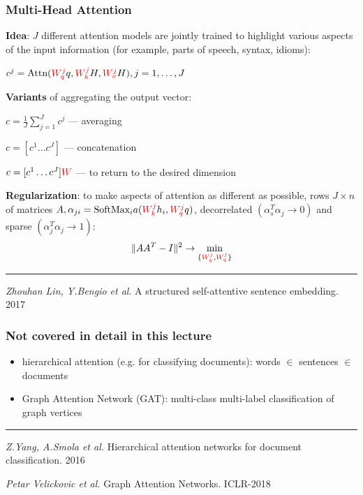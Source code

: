 \documentclass[fullscreen=true, bookmarks=true, hyperref={pdfencoding=unicode}]{beamer}
\begin{document}
\begin{frame}
  \frametitle{Multi-Head Attention}

  {\bf Idea}: $J$ different attention models are jointly trained to highlight various aspects of the input information (for example, parts of speech, syntax, idioms):

  $ c^j = \text{Attn}({\color{red}W^j_q} q, {\color{red}W^j_k} H, {\color{red}W^j_v} H), j = 1, \dots, J$

  \pause
  {\bf Variants} of aggregating the output vector:

  $ c = \frac{1}{J} \sum\limits_{j=1}^J c^j$ — averaging

  $ c = [c^1 \dots c^J]$ — concatenation

  $ c = [c^1 \dots c^J] {\color{red}W}$ — to return to the desired dimension

  \pause
  {\bf Regularization}: to make aspects of attention as different as possible, rows $J \times n$ of matrices $A, \alpha_{ji} = \text{SoftMax}_i a({\color{red}W_k^j}h_i, {\color{red}W_q^j}q)$, decorrelated $(\alpha_{s}^T\alpha_{j} \to 0)$ and sparse $(\alpha_{j}^T\alpha_{j} \to 1)$:
  $$\|AA^T - I \|^2 \to \min\limits_{\{{\color{red}W_k^j}, {\color{red}W_q^j}\}} $$

  \noindent\rule{8cm}{0.4pt}
  \vspace{-0.1cm}

  {\small
  {\it Zhouhan Lin, Y.Bengio et al}. A structured self-attentive sentence embedding. 2017}
\end{frame}



\begin{frame}
  \frametitle{Not covered in detail in this lecture}

   \begin{itemize}
     \item hierarchical attention (e.g. for classifying documents): words $\in$ sentences $\in$ documents
     \item Graph Attention Network (GAT): multi-class multi-label classification of graph vertices
   \end{itemize}
   \vspace{3cm}

  \noindent\rule{8cm}{0.4pt}

  {\small
  {\it Z.Yang, A.Smola et al.} Hierarchical attention networks for document classification. 2016

  {\it Petar Velickovic et al.} Graph Attention Networks. ICLR-2018}
\end{frame}
\end{document}
